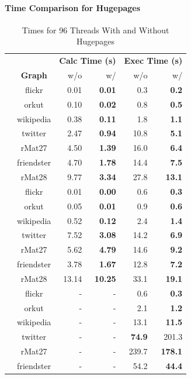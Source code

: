 \paragraph{Time Comparison for Hugepages}
\begin{table}
	\caption{Times for 96 Threads With and Without Hugepages}
	\label{tbl:timeComparison_HPnoHP}
	\renewcommand{\arraystretch}{1.2}
	\centering
	\begin{tabular}{ccr@{\tabskip 2 \tabcolsep}rr@{\tabskip 2 \tabcolsep}r}
		\toprule
		&&\multicolumn{2}{c}{\bf Calc Time (s)}&\multicolumn{2}{c}{\bf Exec Time (s)}\\
		\cmidrule{3-4}\cmidrule{5-6}
		&\bf Graph&w/o&w/&w/o&w/\\
		\midrule
		\multirow{7}{0.5ex}{\rotatebox{90}{\bf SSSP}}
		& flickr & 0.01 & \bf 0.01 & 0.3 & \bf 0.2 \\
		& orkut & 0.10 & \bf 0.02 & 0.8 & \bf 0.5 \\
		& wikipedia & 0.38 & \bf 0.11 & 1.8 & \bf 1.1 \\
		& twitter & 2.47 & \bf 0.94 & 10.8 & \bf 5.1 \\
		& rMat27 & 4.50 & \bf 1.39 & 16.0 & \bf 6.4 \\
		& friendster & 4.70 & \bf 1.78 & 14.4 & \bf 7.5 \\
		& rMat28 & 9.77 & \bf 3.34 & 27.8 & \bf 13.1 \\
		\midrule
		\multirow{7}{0.5ex}{\rotatebox{90}{\bf BFS}}
		& flickr & 0.01 & \bf 0.00 & 0.6 & \bf 0.3 \\
		& orkut & 0.05 & \bf 0.01 & 0.9 & \bf 0.6 \\
		& wikipedia & 0.52 & \bf 0.12 & 2.4 & \bf 1.4 \\
		& twitter & 7.52 & \bf 3.08 & 14.2 & \bf 6.9 \\
		& rMat27 & 5.62 & \bf 4.79 & 14.6 & \bf 9.2 \\
		& friendster & 3.78 & \bf 1.67 & 12.8 & \bf 7.2 \\
		& rMat28 & 13.14 & \bf 10.25 & 33.1 & \bf 19.1 \\
		\midrule
		\multirow{7}{0.5ex}{\rotatebox{90}{\bf PR Push}}
		& flickr & - & - & 0.6 & \bf 0.3 \\
		& orkut & - & - & 2.1 & \bf 1.2 \\
		& wikipedia & - & - & 13.1 & \bf 11.5 \\
		& twitter & - & - & \bf 74.9 & 201.3 \\
		& rMat27 & - & - & 239.7 & \bf 178.1 \\
		& friendster & - & - & 54.2 & \bf 44.4 \\

\end{tabular}
\end{table}
